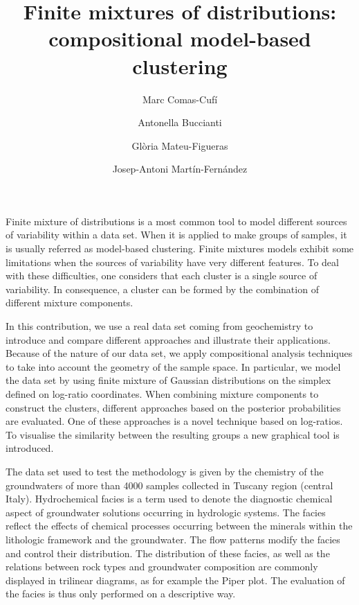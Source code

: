 \documentclass[a4paper,11pt]{article}
\title{Finite mixtures of distributions: compositional model-based clustering}
\author{Marc Comas-Cufí \and Antonella Buccianti \and Glòria Mateu-Figueras \and Josep-Antoni Martín-Fernández}
\begin{document}
\maketitle

Finite mixture of distributions is a most common tool to model different sources of variability within a data set. When it is applied to make groups of samples, it is usually referred as model-based clustering. Finite mixtures models exhibit some limitations when the sources of variability have very different features. To deal with these difficulties, one considers that each cluster is a single source of variability. In consequence, a cluster can be formed by the combination of different mixture components.

In this contribution, we use a real data set coming from geochemistry to introduce and compare different approaches and illustrate their applications. Because of the nature of our data set, we apply compositional analysis techniques to take into account the geometry of the sample space. In particular, we model the data set by using finite mixture of Gaussian distributions on the simplex defined on log-ratio coordinates. When combining mixture components to construct the clusters, different approaches based on the posterior probabilities are evaluated. One of these approaches is a novel technique based on log-ratios. To visualise the similarity between the resulting groups a new graphical tool is introduced.

The data set used to test the methodology is given by the chemistry of the groundwaters of more than 4000 samples collected in Tuscany region (central Italy). Hydrochemical facies is a term used to denote the diagnostic chemical aspect of groundwater solutions occurring in hydrologic systems. The facies reflect the effects of chemical processes occurring between the minerals within the lithologic framework and the groundwater. The flow patterns modify the facies and control their distribution. The distribution of these facies, as well as the relations between rock types and groundwater composition are commonly displayed in trilinear diagrams, as for example the Piper plot. The evaluation of the facies is thus only performed on a descriptive way.
\end{document}
